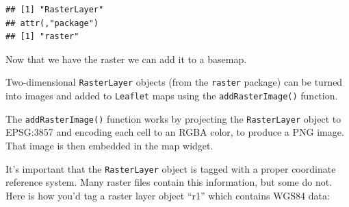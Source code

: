 \documentclass[]{book}
\newenvironment{Shaded}{\begin{snugshade}}{\end{snugshade}}
\newcommand{\CommentTok}[1]{\textcolor[rgb]{0.56,0.35,0.01}{\textit{#1}}}
\newcommand{\DataTypeTok}[1]{\textcolor[rgb]{0.13,0.29,0.53}{#1}}
\newcommand{\FloatTok}[1]{\textcolor[rgb]{0.00,0.00,0.81}{#1}}
\newcommand{\KeywordTok}[1]{\textcolor[rgb]{0.13,0.29,0.53}{\textbf{#1}}}
\newcommand{\NormalTok}[1]{#1}
\newcommand{\OperatorTok}[1]{\textcolor[rgb]{0.81,0.36,0.00}{\textbf{#1}}}
\newcommand{\StringTok}[1]{\textcolor[rgb]{0.31,0.60,0.02}{#1}}
\begin{document}
\begin{verbatim}
## [1] "RasterLayer"
## attr(,"package")
## [1] "raster"
\end{verbatim}

Now that we have the raster we can add it to a basemap.

Two-dimensional \texttt{RasterLayer} objects (from the \texttt{raster} package) can be turned into images and added to \texttt{Leaflet} maps using the \texttt{addRasterImage()} function.

The \texttt{addRasterImage()} function works by projecting the \texttt{RasterLayer} object to EPSG:3857 and encoding each cell to an RGBA color, to produce a PNG image. That image is then embedded in the map widget.

It's important that the \texttt{RasterLayer} object is tagged with a proper coordinate reference system. Many raster files contain this information, but some do not. Here is how you'd tag a raster layer object ``r1'' which contains WGS84 data:

\begin{Shaded}
\end{Shaded}
\end{document}
